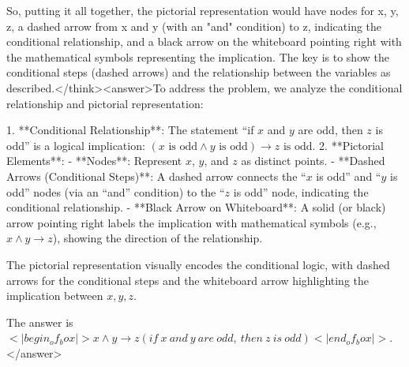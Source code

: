 So, putting it all together, the pictorial representation would have nodes for x, y, z, a dashed arrow from x and y (with an "and" condition) to z, indicating the conditional relationship, and a black arrow on the whiteboard pointing right with the mathematical symbols representing the implication. The key is to show the conditional steps (dashed arrows) and the relationship between the variables as described.</think><answer>To address the problem, we analyze the conditional relationship and pictorial representation:  

1. **Conditional Relationship**: The statement “if \( x \) and \( y \) are odd, then \( z \) is odd” is a logical implication: \( (x \text{ is odd} \land y \text{ is odd}) \rightarrow z \text{ is odd} \).  
2. **Pictorial Elements**:  
   - **Nodes**: Represent \( x \), \( y \), and \( z \) as distinct points.  
   - **Dashed Arrows (Conditional Steps)**: A dashed arrow connects the “\( x \) is odd” and “\( y \) is odd” nodes (via an “and” condition) to the “\( z \) is odd” node, indicating the conditional relationship.  
   - **Black Arrow on Whiteboard**: A solid (or black) arrow pointing right labels the implication with mathematical symbols (e.g., \( x \land y \rightarrow z \)), showing the direction of the relationship.  

The pictorial representation visually encodes the conditional logic, with dashed arrows for the conditional steps and the whiteboard arrow highlighting the implication between \( x, y, z \).  

The answer is \(<|begin_of_box|>x \land y \rightarrow z (if\ x\ and\ y\ are\ odd,\ then\ z\ is\ odd)<|end_of_box|>\).</answer>